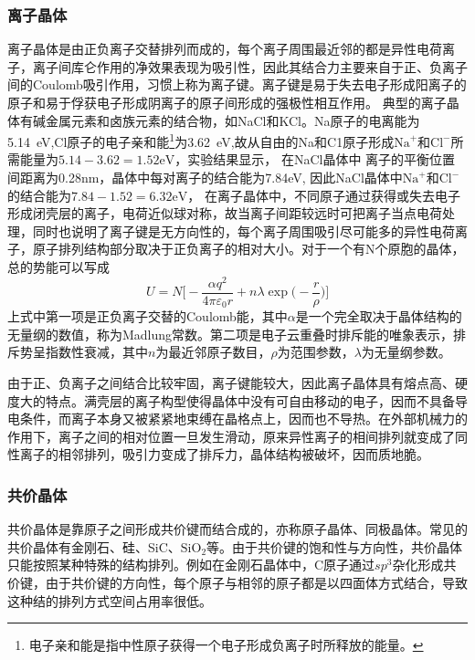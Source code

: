\subsubsection{离子晶体} 
离子晶体是由正负离子交替排列而成的，每个离子周围最近邻的都是异性电荷离子，离子间库仑作用的净效果表现为吸引性，因此其结合力主要来自于正、负离子间的Coulomb吸引作用，习惯上称为离子键。离子键是易于失去电子形成阳离子的原子和易于俘获电子形成阴离子的原子间形成的强极性相互作用。
典型的离子晶体有碱金属元素和卤族元素的结合物，如NaCl和KCl。Na原子的电离能为5.14~eV,Cl原子的电子亲和能\footnote{电子亲和能是指中性原子获得一个电子形成负离子时所释放的能量。}为3.62~eV,故从自由的Na和C1原子形成$\mathrm{Na}^+$和$\mathrm{Cl}^-$所需能量为$5.14-3.62=1.52\mathrm{eV}$，实验结果显示，%
在NaCl晶体中%
离子的平衡位置间距离为0.28nm，晶体中每对离子的结合能为7.84eV, 因此NaCl晶体中$\mathrm{Na}^+$和$\mathrm{Cl}^-$的结合能为$7.84-1.52=6.32\mathrm{eV}$，%
在离子晶体中，不同原子通过获得或失去电子形成闭壳层的离子，电荷近似球对称，故当离子间距较远时可把离子当点电荷处理，同时也说明了离子键是无方向性的，每个离子周围吸引尽可能多的异性电荷离子，原子排列结构部分取决于正负离子的相对大小。对于一个有N个原胞的晶体，总的势能可以写成
\begin{equation}
	U=N\bigg[-\dfrac{\alpha q^2}{4\pi\varepsilon_0r}+n\lambda\exp\big(-\dfrac r{\rho}\big)\bigg]
	\label{eq:SSI-03}
\end{equation} 
上式中第一项是正负离子交替的Coulomb能，其中$\alpha$是一个完全取决于晶体结构的无量纲的数值，称为Madlung常数。第二项是电子云重叠时排斥能的唯象表示，排斥势呈指数性衰减，其中$n$为最近邻原子数目，$\rho$为范围参数，$\lambda$为无量纲参数。

由于正、负离子之间结合比较牢固，离子键能较大，因此离子晶体具有熔点高、硬度大的特点。满壳层的离子构型使得晶体中没有可自由移动的电子，因而不具备导电条件，而离子本身又被紧紧地束缚在晶格点上，因而也不导热。在外部机械力的作用下，离子之间的相对位置一旦发生滑动，原来异性离子的相间排列就变成了同性离子的相邻排列，吸引力变成了排斥力，晶体结构被破坏，因而质地脆。

\subsubsection{共价晶体} 
共价晶体是靠原子之间形成共价键而结合成的，亦称原子晶体、同极晶体。常见的共价晶体有金刚石、硅、SiC、$\mathrm{SiO}_2$等。由于共价键的饱和性与方向性，共价晶体只能按照某种特殊的结构排列。例如在金刚石晶体中，C原子通过$sp^3$杂化形成共价键，由于共价键的方向性，每个原子与相邻的原子都是以四面体方式结合，导致这种结的排列方式空间占用率很低。

